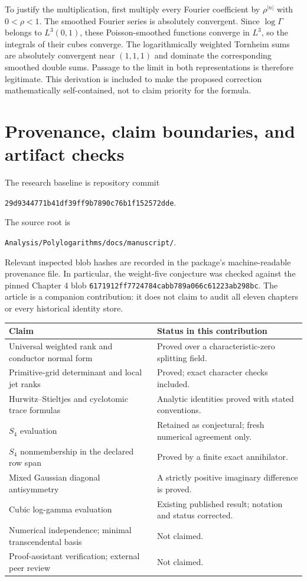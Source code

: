 \documentclass[11pt]{article}
\numberwithin{equation}{section}
\theoremstyle{definition}
\theoremstyle{remark}
\newcommand{\code}[1]{\texttt{\small #1}}
\begin{document}
To justify the multiplication, first multiply every Fourier
coefficient by $\rho^{|n|}$ with $0<\rho<1$. The smoothed Fourier
series is absolutely convergent. Since $\log\Gamma$ belongs to
$L^3(0,1)$, these Poisson-smoothed functions converge in $L^3$, so
the integrals of their cubes converge. The logarithmically weighted
Tornheim sums are absolutely convergent near $(1,1,1)$ and dominate
the corresponding smoothed double sums. Passage to the limit in both
representations is therefore legitimate. This derivation is included
to make the proposed correction mathematically self-contained, not to
claim priority for the formula.

\clearpage
\section{Provenance, claim boundaries, and artifact checks}\label{app:provenance}

The research baseline is repository commit
\begin{center}
\code{29d9344771b41df39ff9b7890c76b1f152572dde}.
\end{center}
The source root is
\begin{center}
\code{Analysis/Polylogarithms/docs/manuscript/}.
\end{center}
Relevant inspected blob hashes are recorded in the package's machine-readable
provenance file. In particular, the weight-five conjecture was checked
against the pinned Chapter 4 blob
\code{6171912ff7724784cabb789a066c61223ab298bc}.
The article is a companion contribution: it does not claim to audit
all eleven chapters or every historical identity store.

\begin{center}
\begin{tabular}{p{}p{}}
\toprule
Claim & Status in this contribution\\\midrule
Universal weighted rank and conductor normal form & Proved over a characteristic-zero splitting field.\\
Primitive-grid determinant and local jet ranks & Proved; exact character checks included.\\
Hurwitz--Stieltjes and cyclotomic trace formulas & Analytic identities proved with stated conventions.\\
$S_4$ evaluation & Retained as conjectural; fresh numerical agreement only.\\
$S_4$ nonmembership in the declared row span & Proved by a finite exact annihilator.\\
Mixed Gaussian diagonal antisymmetry & A strictly positive imaginary difference is proved.\\
Cubic log-gamma evaluation & Existing published result; notation and status corrected.\\
Numerical independence; minimal transcendental basis & Not claimed.\\
Proof-assistant verification; external peer review & Not claimed.\\
\bottomrule
\end{tabular}
\end{center}
\end{document}
